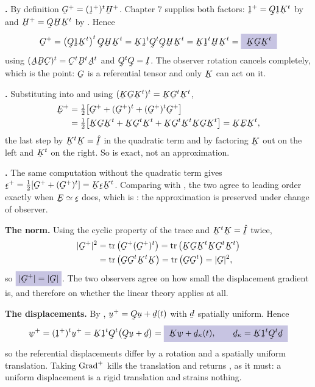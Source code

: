 \begin{solution}
\textbf{.} By definition $\bG^{+}=(\shift^{+})^{t}\bH^{+}$.
Chapter 7 supplies both factors: $\shift^{+}=\bQ\shift\bK^{t}$ by
 and $\bH^{+}=\bQ\bH\bK^{t}$ by . Hence
\[
   \bG^{+}=\big(\bQ\shift\bK^{t}\big)^{t}\,\bQ\bH\bK^{t}
   =\bK\shift^{t}\bQ^{t}\bQ\bH\bK^{t}
   =\bK\shift^{t}\bH\bK^{t}
   =\boxed{\;\bK\bG\bK^{t}\;}
\]
using $(\bA\bB\bC)^{t}=\bC^{t}\bB^{t}\bA^{t}$ and $\bQ^{t}\bQ=\I$. The
observer rotation cancels completely, which is the point: $\bG$ is a
referential tensor and only $\bK$ can act on it.

\textbf{.} Substituting into  and using
$(\bK\bG\bK^{t})^{t}=\bK\bG^{t}\bK^{t}$,
\[
\begin{aligned}
   \bE^{+}&=\tfrac12\big[\bG^{+}+(\bG^{+})^{t}
   +(\bG^{+})^{t}\bG^{+}\big]\\
   &=\tfrac12\big[\bK\bG\bK^{t}+\bK\bG^{t}\bK^{t}
   +\bK\bG^{t}\bK^{t}\bK\bG\bK^{t}\big]
   =\bK\bE\bK^{t},
\end{aligned}
\]
the last step by $\bK^{t}\bK=\hI$ in the quadratic term and by
factoring $\bK$ out on the left and $\bK^{t}$ on the right. So
 is exact, not an approximation.

\textbf{.} The same computation without the quadratic term
gives $\vek{\epsilon}^{+}=\tfrac12[\bG^{+}+(\bG^{+})^{t}]
=\bK\vek{\epsilon}\bK^{t}$. Comparing with , the two agree
to leading order exactly when $\bE\simeq\vek{\epsilon}$ does, which is
: the approximation is preserved under change of observer.

\textbf{The norm.} Using the cyclic property of the trace and
$\bK^{t}\bK=\hI$ twice,
\[
\begin{aligned}
   |\bG^{+}|^{2}&=\tr\big(\bG^{+}(\bG^{+})^{t}\big)
   =\tr\big(\bK\bG\bK^{t}\bK\bG^{t}\bK^{t}\big)\\
   &=\tr\big(\bG\bG^{t}\bK^{t}\bK\big)
   =\tr\big(\bG\bG^{t}\big)=|\bG|^{2},
\end{aligned}
\]
so $\boxed{|\bG^{+}|=|\bG|}$. The two observers agree on how small the
displacement gradient is, and therefore on whether the linear theory
applies at all.

\textbf{The displacements.} By , $\bu^{+}=\bQ\bu+\bd(t)$ with
$\bd$ spatially uniform. Hence
\[
   \bw^{+}=(\shift^{+})^{t}\bu^{+}
   =\bK\shift^{t}\bQ^{t}\big(\bQ\bu+\bd\big)
   =\boxed{\;\bK\bw+\bd_{\kappa}(t),\qquad
   \bd_{\kappa}=\bK\shift^{t}\bQ^{t}\bd\;}
\]
so the referential displacements differ by a rotation and a
spatially uniform translation. Taking $\operatorname{Grad}^{+}$ kills the translation
and returns , as it must: a uniform displacement is a rigid
translation and strains nothing.
\end{solution}

